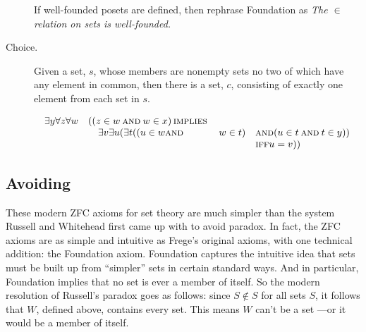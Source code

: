 \begin{description}
\begin{editingnotes}
If well-founded posets are defined, then rephrase Foundation as
\emph{The $\in$ relation on sets is well-founded.}
\end{editingnotes}

\item[\index{Choice axiom}Choice.]  Given a set, $s$, whose members are nonempty sets no two
  of which have any element in common, then there is a set, $c$,
  consisting of exactly one element from each set in $s$.


\iffalse
\begin{tabbing}
$\exists y \, \forall z \, \forall w \,
 \biggl( ($\=$z \in w \,\QAND\, w \in x) \; \QIMPLIES $\\
\> $\exists v \, \exists u \, \Bigl(\exists t \, \bigr((u \in w \, \QAND \, w \in t)$\=$\;\QAND\; (u \in t \,\QAND\, t \in y)\bigl) $\\
\> \> $\QIFF\; u = v\Bigr) \biggr)$
\end{tabbing}
\fi


\begin{editingnotes}

\[\begin{array}{rlll}
\exists y \forall z \forall w & ( (z \in w \mathbin{\mathrm{\textsc{and}}} w \in x) \mathbin{\mathrm{\textsc{\,implies\,}}}\\
                              &\quad \exists v \exists u (\exists t
                                           ((u \in w \mathbin{\mathrm{\textsc{and}}} & w \in t)
                                                              & \mathbin{\mathrm{\textsc{and}}} (u \in t \mathbin{\mathrm{\textsc{and}}} t \in y))\\
                                                            &&& \mathbin{\mathrm{\textsc{iff}}} u = v))
\end{array}\]

\end{editingnotes}

\end{description}


\subsection{Avoiding }

These modern ZFC axioms for set theory are much simpler than the system
Russell and Whitehead first came up with to avoid paradox.  In fact, the
ZFC axioms are as simple and intuitive as Frege's original axioms, with
one technical addition: the Foundation axiom.  Foundation captures the
intuitive idea that sets must be built up from ``simpler'' sets in certain
standard ways.  And in particular, Foundation implies that no set is ever
a member of itself.  So the modern resolution of Russell's paradox goes as
follows: since $S \not \in S$ for all sets $S$, it follows that $W$,
defined above, contains every set.  This means $W$ can't be a set ---or it
would be a member of itself.

